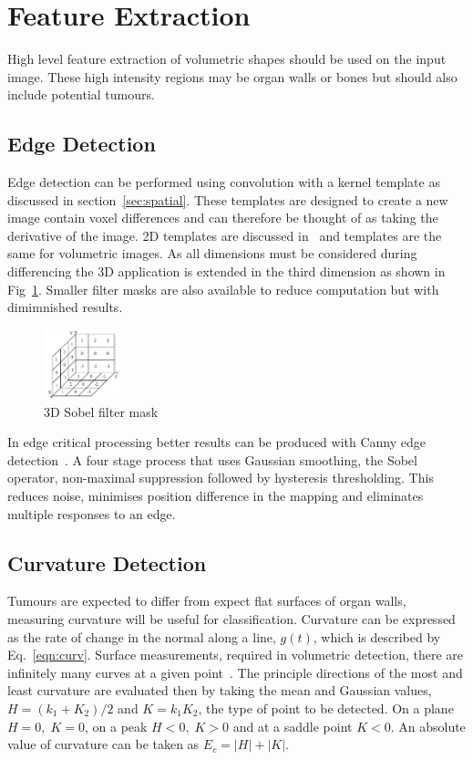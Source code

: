 \documentclass[journal]{IEEEtran}
\begin{document}
\section{Feature Extraction}
\label{sec:extraction}

High level feature extraction of volumetric shapes should be used on the input image.
These high intensity regions may be organ walls or bones but should also include potential tumours.


\subsection{Edge Detection}
\label{sec:edge}
Edge detection can be performed using convolution with a kernel template as discussed in section~\ref{sec:spatial}. 
These templates are designed to create a new image contain voxel differences and can therefore be thought of as taking the derivative of the image.
2D templates are discussed in~\cite{nixon02feature} and templates are the same for volumetric images.
As all dimensions must be considered during differencing the 3D application is extended in the third dimension as shown in Fig~\ref{fig:sobel}.
Smaller filter masks are also available to reduce computation but with dimimnished results.

\begin{figure}[!htb]
   \centering
   \includegraphics[width = 0.2\textwidth]{Figures/Sobel.pdf}
   \caption{3D Sobel filter mask~\cite{lohmann1998volumetric}}
   \label{fig:sobel}
\end{figure}

In edge critical processing better results can be produced with Canny edge detection~\cite{canny86edge}. 
A four stage process that uses Gaussian smoothing, the Sobel operator, non-maximal suppression followed by hysteresis thresholding.
This reduces noise, minimises position difference in the mapping and eliminates multiple responses to an edge.




\subsection{Curvature Detection}
\label{sec:curvature_detection}
Tumours are expected to differ from expect flat surfaces of organ walls, measuring curvature will be useful for classification.
Curvature can be expressed as the rate of change in the normal along a line, $g(t)$, which is described by Eq.~\ref{eqn:curv}.
Surface measurements, required in volumetric detection, there are infinitely many curves at a given point~\cite{lohmann1998volumetric}.
The principle directions of the most and least curvature are evaluated then by taking the mean and Gaussian values, $H = (k_1 + K_2)/2$ and $K = k_1K_2$, the type of point to be detected.
On a plane $H = 0,\;K=0$, on a peak $H<0,\;K>0$ and at a saddle point $K<0$.
An absolute value of curvature can be taken as $E_c=|H|+|K|$.
\end{document}
